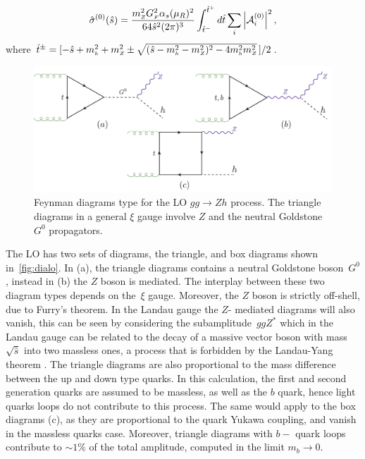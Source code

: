 \begin{equation}
\hat{\sigma}^{(0)}(\hat{s})=
\frac{m_{ \scriptscriptstyle Z}^2 G_{ \scriptscriptstyle F}^2 \alpha_s(\mu_R)^2}{64 \hat{s}^2(2\pi)^3}
\int^{\hat{t}^+}_{\hat{t}^-}d\hat{t}\sum_i \left|{\cal A}_i^{(0)}\right|^2,
\end{equation}
where
$\hat{t}^\pm=[-\hat{s}+m_{ \scriptscriptstyle h}^2+m_{ \scriptscriptstyle Z}^2\pm\sqrt{(\hat{s}-m_{ \scriptscriptstyle h}^2-m_{ \scriptscriptstyle Z}^2)^2-4m_{ \scriptscriptstyle h}^2m_{ \scriptscriptstyle Z}^2}\,]/2$.
\begin{figure}
	\begin{center}
		\includegraphics[width=12cm]{./figures/Feynman_LO}
		\caption{Feynman diagrams type for the LO $gg \to Zh$ process. The triangle diagrams in a general $\xi$ gauge involve $Z$ and the neutral Goldstone~$G^0$ propagators. }
		\label{fig:dialo}
	\end{center}
\end{figure}
\par The LO has two sets of diagrams, the triangle, and box diagrams shown in~\autoref{fig:dialo}. In (a), the triangle diagrams contains a neutral Goldstone boson~$G^0$, instead in (b) the $Z$ boson is mediated. The interplay between these two diagram types depends on the~$\xi$ gauge. Moreover, the $Z$ boson is strictly off-shell, due to Furry's theorem.
In the Landau gauge the $Z$- mediated diagrams will also vanish, this can be seen by considering the subamplitude~$ggZ^*$ which in the Landau gauge can be related to the decay of a massive vector boson
with mass $\sqrt{\hat{s}}$ into two massless ones, a process that is
forbidden by the Landau-Yang theorem \cite{Landau:1948kw,Yang:1950rg}.
The triangle diagrams are also proportional to the mass difference between the up and down type quarks. In this calculation, the first and second generation quarks are assumed to be massless, as well as the $b$ quark, hence light quarks loops  do not contribute to this process. The same would apply to the box diagrams (c), as they are proportional to the quark Yukawa coupling, and vanish in the massless quarks case. Moreover, triangle diagrams with $b-$ quark loops contribute to $ \sim 1\%$ of the total amplitude, computed in the limit $m_b \to 0$.  
